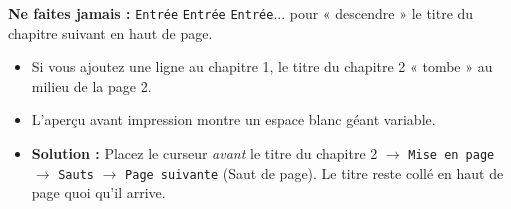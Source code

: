 \documentclass[11pt]{article}
\begin{document}
\begin{attention}
    \textbf{Ne faites jamais :} \texttt{Entrée} \texttt{Entrée} \texttt{Entrée}... pour « descendre » le titre du chapitre suivant en haut de page.
    \begin{itemize}
        \item Si vous ajoutez une ligne au chapitre 1, le titre du chapitre 2 « tombe » au milieu de la page 2.
        \item L'aperçu avant impression montre un espace blanc géant variable.
        \item \textbf{Solution :} Placez le curseur \emph{avant} le titre du chapitre 2 $\rightarrow$ \texttt{Mise en page} $\rightarrow$ \texttt{Sauts} $\rightarrow$ \texttt{Page suivante} (Saut de page). Le titre reste collé en haut de page quoi qu'il arrive.
    \end{itemize}
\end{attention}
\end{document}
